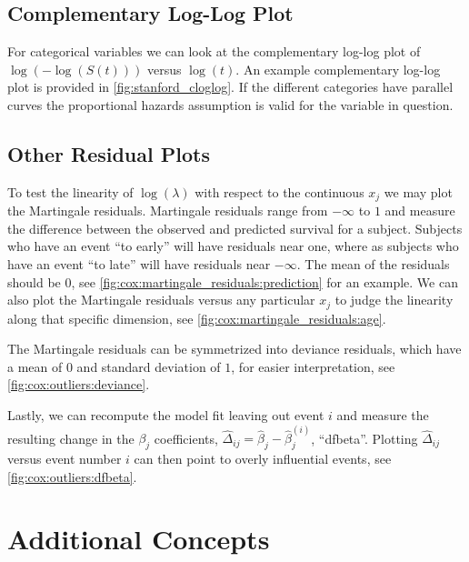 \subsection{Complementary Log-Log Plot}
\label{survival:assumptions:cloglog}

For categorical variables we can look at the
complementary log-log plot
of $\log\left(-\log\left(S\left(t\right)\right)\right)$ versus $\log\left(t\right)$.
An example complementary log-log plot is provided in \cref{fig:stanford_cloglog}.
If the different categories have parallel curves
the proportional hazards assumption is
valid for the variable in question.

\subsection{Other Residual Plots}
\label{survival:assumptions:linearity}

To test the linearity of $\log\left(\lambda\right)$ with respect to the continuous $x_{j}$
we may plot the Martingale residuals.
Martingale residuals range from $-\infty$ to $1$
and measure the difference between the observed and predicted survival for a subject.
Subjects who have an event ``to early'' will have residuals near one,
where as subjects who have an event ``to late'' will have residuals near $-\infty$.
The mean of the residuals should be $0$, see \cref{fig:cox:martingale_residuals:prediction} for an example.
We can also plot the Martingale residuals versus any particular $x_{j}$
to judge the linearity along that specific dimension, see \cref{fig:cox:martingale_residuals:age}.

The Martingale residuals can be symmetrized into deviance residuals,
which have a mean of $0$ and standard deviation of $1$,
for easier interpretation, see \cref{fig:cox:outliers:deviance}.

Lastly, we can recompute the model fit leaving out event $i$
and measure the resulting change in the $\beta_{j}$ coefficients,
$\hat{\Delta}_{ij} = \hat{\beta}_{j} - \hat{\beta}_{j}^{\left(i\right)}$, \ie ``dfbeta''.
Plotting $\hat{\Delta}_{ij}$ versus event number $i$
can then point to overly influential events, see \cref{fig:cox:outliers:dfbeta}.

\section{Additional Concepts}
\label{survival:additional}

